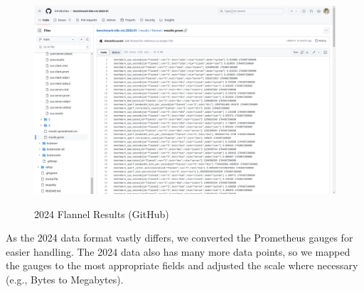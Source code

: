 \begin{figure}[H]
\centering
\caption {2024 Flannel Results (GitHub)}
\includegraphics[width=\linewidth]{images/flannel-prom.png}
\label{fig:flannel-prom}
\end{figure}

As the 2024 data format vastly differs, we converted the Prometheus gauges for easier handling. The 2024 data also has many more data points, so we mapped the gauges to the most appropriate fields and adjusted the scale where necessary (e.g., Bytes to Megabytes).

